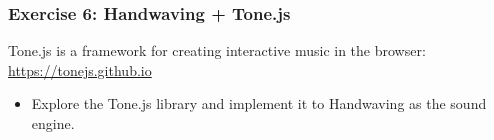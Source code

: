 \documentclass[screen, aspectratio=43]{beamer}
\begin{document}
%
\begin{frame}
  \frametitle{Exercise 6: Handwaving + Tone.js}
  Tone.js is a framework for creating interactive music in the browser: \url{https://tonejs.github.io}
    \begin{itemize}
    	\item Explore the Tone.js library and implement it to Handwaving as the sound engine.
    \end{itemize}
\end{frame}
%
%
%
%
\end{document}
